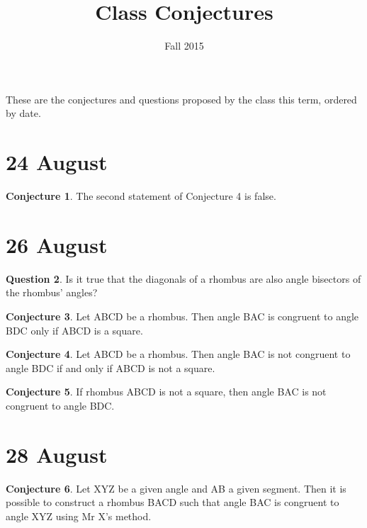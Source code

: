 \documentclass{amsart}
\theoremstyle{definition}
\newtheorem{conjecture}{Conjecture}
\newtheorem{question}[conjecture]{Question}
\begin{document}
\title{Class Conjectures}
\date{Fall 2015}

\maketitle


These are the conjectures and questions proposed by the class this term, ordered by date.

\section*{24 August}

\begin{conjecture} 
The second statement of Conjecture 4 is false.
\end{conjecture}

\section*{26 August}

\begin{question} 
Is it true that the diagonals of a rhombus are also angle bisectors of the rhombus' angles?
\end{question}

\begin{conjecture} 
Let ABCD be a rhombus. Then angle BAC is congruent to angle BDC only if ABCD is a square.
\end{conjecture}

\begin{conjecture} 
Let ABCD be a rhombus. Then angle BAC is not congruent to angle BDC if and only if ABCD is not a square.
\end{conjecture}

\begin{conjecture} If rhombus ABCD is not a square, then  angle BAC is not congruent to angle BDC.
\end{conjecture}

\section*{28 August}

\begin{conjecture}
Let XYZ be a given angle and AB a given segment. Then it is possible to construct a rhombus BACD such that angle BAC is
congruent to angle XYZ using Mr X's method.
\end{conjecture}
\end{document}
